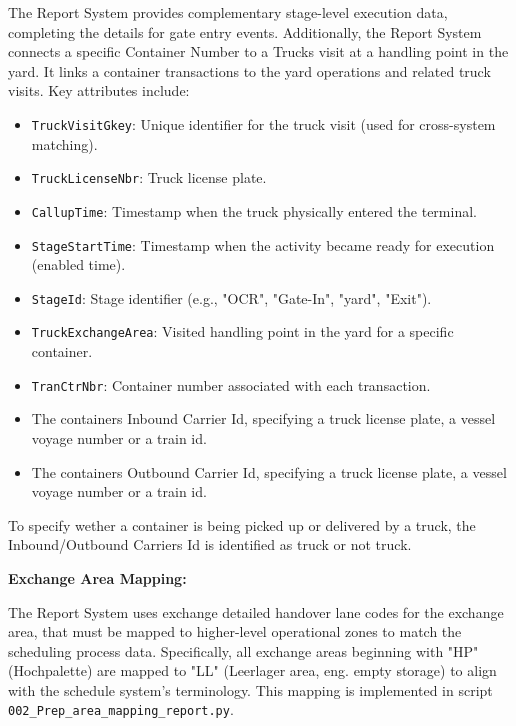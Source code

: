         The Report System provides complementary stage-level execution data, completing the details for gate entry events. Additionally, the Report System connects a specific Container Number to a Trucks visit at a handling point in the yard.  It links a container transactions to the yard operations and related truck visits. Key attributes include:
        
        \begin{itemize}
            \item \texttt{TruckVisitGkey}: Unique identifier for the truck visit (used for cross-system matching).
            \item \texttt{TruckLicenseNbr}: Truck license plate.
            \item \texttt{CallupTime}: Timestamp when the truck physically entered the terminal.
            \item \texttt{StageStartTime}: Timestamp when the activity became ready for execution (enabled time).
            \item \texttt{StageId}: Stage identifier (e.g., "OCR", "Gate-In", "yard", "Exit").
            \item \texttt{TruckExchangeArea}: Visited handling point in the yard for a specific container.
            \item \texttt{TranCtrNbr}: Container number associated with each transaction.
            \item {} The containers Inbound Carrier Id, specifying a truck license plate, a vessel voyage number or a train id. 
            \item {} The containers Outbound Carrier Id, specifying a truck license plate, a vessel voyage number or a train id. 
        \end{itemize}
        
        To specify wether a container is being picked up or delivered by a truck, the Inbound/Outbound Carriers Id is identified as truck or not truck. 
        
        \textbf{Exchange Area Mapping:}
        
        The Report System uses exchange detailed handover lane codes for the exchange area, that must be mapped to higher-level operational zones to match the scheduling process data. Specifically, all exchange areas beginning with "HP" (Hochpalette) are mapped to "LL" (Leerlager area, eng. empty storage) to align with the schedule system's terminology. This mapping is implemented in script \texttt{002\_Prep\_area\_mapping\_report.py}.

